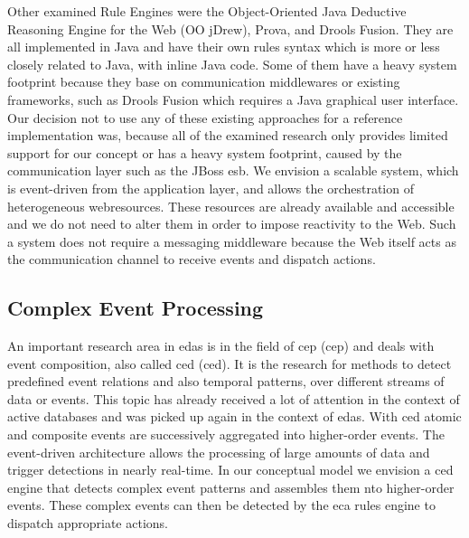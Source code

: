 Other examined Rule Engines were the \textrm{Object-Oriented Java Deductive Reasoning Engine for the Web} (\textrm{OO jDrew}), \textrm{Prova}, and \textrm{Drools Fusion}.
They are all implemented in \textrm{Java} and have their own rules syntax which is more or less closely related to \textrm{Java}, with inline \textrm{Java} code.
Some of them have a heavy system footprint because they base on communication middlewares or existing frameworks, such as \textrm{Drools Fusion} which requires a Java graphical user interface.
Our decision not to use any of these existing approaches for a reference implementation was, because all of the examined research only provides limited support for our concept or has a heavy system footprint, caused by the communication layer such as the \textrm{JBoss \acrshort{esb}}.
We envision a scalable system, which is event-driven from the application layer, and allows the orchestration of heterogeneous \glspl{webresource}.
These resources are already available and accessible and we do not need to alter them in order to impose reactivity to the Web.
Such a system does not require a messaging middleware because the Web itself acts as the communication channel to receive events and dispatch actions.


\subsection{Complex Event Processing}
An important research area in \textrm{\acrlong{eda}s} is in the field of \textrm{\acrlong{cep} (\acrshort{cep})}\cite{anicic2010arlfcepar} and deals with event composition, also called \textrm{\acrlong{ced} (\acrshort{ced})}\cite{akdere2008plan}\cite{2004_1265833}.
It is the research for methods to detect predefined event relations and also temporal patterns, over different streams of data or events.
This topic has already received a lot of attention in the context of active databases\cite{Adaikkalavan2007}\cite{Gehani92compositeevent}\cite{Zimmer99onthe} and was picked up again in the context of \textrm{\acrlong{eda}s}.
With \textrm{\acrshort{ced}} atomic and composite events are successively aggregated into higher-order events.
The event-driven architecture allows the processing of large amounts of data and trigger detections in nearly real-time.
In our conceptual model we envision a \textrm{\acrshort{ced}} engine that detects complex event patterns and assembles them nto higher-order events.
These complex events can then be detected by the \textrm{\acrshort{eca}} rules engine to dispatch appropriate actions.

